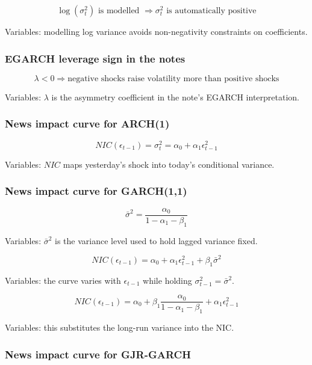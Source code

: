\documentclass[
  8pt,
  twocolumn]{extarticle}
\begin{document}
\[
\log(\sigma_t^2)\text{ is modelled }\Rightarrow \sigma_t^2\text{ is automatically positive}
\]

Variables: modelling log variance avoids non-negativity constraints on
coefficients.

\subsubsection{EGARCH leverage sign in the
notes}\label{egarch-leverage-sign-in-the-notes}

\[
\lambda<0\Rightarrow \text{negative shocks raise volatility more than positive shocks}
\]

Variables: \(\lambda\) is the asymmetry coefficient in the note's EGARCH
interpretation.

\subsubsection{News impact curve for
ARCH(1)}\label{news-impact-curve-for-arch1}

\[
NIC(\epsilon_{t-1})=\sigma_t^2=\alpha_0+\alpha_1\epsilon_{t-1}^2
\]

Variables: \(NIC\) maps yesterday's shock into today's conditional
variance.

\subsubsection{News impact curve for
GARCH(1,1)}\label{news-impact-curve-for-garch11}

\[
\bar\sigma^2=\frac{\alpha_0}{1-\alpha_1-\beta_1}
\]

Variables: \(\bar\sigma^2\) is the variance level used to hold lagged
variance fixed.

\[
NIC(\epsilon_{t-1})=\alpha_0+\alpha_1\epsilon_{t-1}^2+\beta_1\bar\sigma^2
\]

Variables: the curve varies with \(\epsilon_{t-1}\) while holding
\(\sigma_{t-1}^2=\bar\sigma^2\).

\[
NIC(\epsilon_{t-1})=\alpha_0+\beta_1\frac{\alpha_0}{1-\alpha_1-\beta_1}+\alpha_1\epsilon_{t-1}^2
\]

Variables: this substitutes the long-run variance into the NIC.

\subsubsection{News impact curve for
GJR-GARCH}\label{news-impact-curve-for-gjr-garch}
\end{document}
